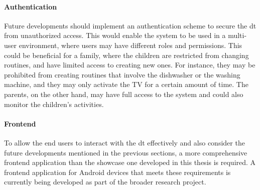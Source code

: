\paragraph{Authentication}

Future developments should implement an authentication scheme to secure the \acrshort{dt} from unauthorized access. This would enable the system to be used in a multi-user environment, where users may have different roles and permissions. This could be beneficial for a family, where the children are restricted from changing routines, and have limited access to creating new ones. For instance, they may be prohibited from creating routines that involve the dishwasher or the washing machine, and they may only activate the TV for a certain amount of time. The parents, on the other hand, may have full access to the system and could also monitor the children's activities.

\paragraph{Frontend}

To allow the end users to interact with the \acrshort{dt} effectively and also consider the future developments mentioned in the previous sections, a more comprehensive frontend application than the showcase one developed in this thesis is required. A frontend application for Android devices that meets these requirements is currently being developed as part of the broader research project.
